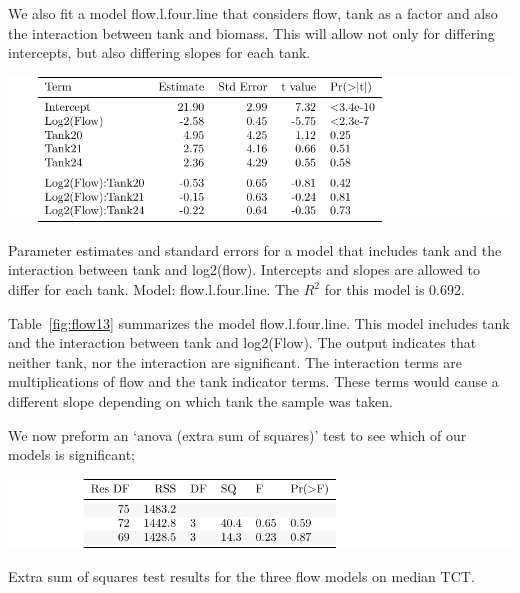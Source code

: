 \newpage

We also fit a  model flow.l.four.line that considers flow, tank as a factor and also the interaction between tank and biomass. This will allow not only for differing intercepts, but also differing slopes for each tank.

\vspace{5mm}

\begin{table}[H]
\includegraphics{Chapter4Images/lfourlinemed.pdf}
\caption{Parameter estimates and standard errors for a model that includes tank and the interaction between tank and log2(flow). Intercepts and slopes are allowed to differ for each tank. Model: flow.l.four.line. The $R^{2}$ for this model is 0.692.}
\label{fig:flow13}
\end{table}

Table~\ref{fig:flow13} summarizes the model flow.l.four.line. This model includes tank and the interaction between tank and log2(Flow). The output indicates that neither tank, nor the interaction are significant. The interaction terms are multiplications of flow and the tank indicator terms. These terms would cause a different slope depending on which tank the sample was taken.

\newpage

 We now preform an `anova (extra sum of squares)' test to see which of our models is significant; 
\vspace{5mm}

\begin{table}[H]
\includegraphics{Chapter4Images/anovamed.pdf}
\caption{Extra sum of squares test results for  the three flow models on median TCT.}
\label{fig:anovaflow}
\end{table}


  
  
